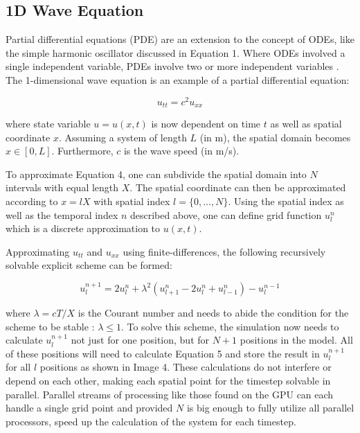 \documentclass[sigconf]{nimeart}
\begin{document}
\subsection{1D Wave Equation}\label{d-wave-equation}

Partial differential equations (PDE) are an extension to the concept of ODEs, like the simple harmonic oscillator discussed in Equation 1. Where ODEs involved a single independent variable, PDEs involve two or more independent variables \cite{Evans2012Numerical}. The 1-dimensional wave equation is an example of a partial differential equation:


\begin{equation}u_{tt} = c^2 u_{xx}\end{equation}


where state variable $u = u(x,t)$ is now dependent on time $t$ as well as spatial coordinate $x$. Assuming a system of length $L$ (in m), the spatial domain becomes $x\in [0, L]$. Furthermore, $c$ is the wave speed (in m/s).

To approximate Equation 4, one can subdivide the spatial domain into $N$ intervals with equal length $X$. The spatial coordinate can then be approximated according to $x=lX$ with spatial index $l = \{0, ..., N\}$. Using the spatial index as well as the temporal index $n$ described above, one can define grid function $u_l^n$ which is a discrete approximation to $u(x,t)$.

Approximating $u_{tt}$ and $u_{xx}$ using finite-differences, the following recursively solvable explicit scheme can be formed:


\begin{equation}u_{l}^{n+1} = 2 u_{l}^{n} + \lambda^2 (u_{l+1}^{n} - 2 u_{l}^{n} + u_{l-1}^{n}) - u_{l}^{n-1}\end{equation}


where $\lambda = c T/X$ is the Courant number and needs to abide the condition for the scheme to be stable \cite{Courant1928Über}: $\lambda \leq 1$. To solve this scheme, the simulation now needs to calculate $u_l^{n+1}$ not just for one position, but for $N+1$ positions in the model. All of these positions will need to calculate Equation 5 and store the result in $u^{n+1}_{l}$ for all $l$ positions as shown in Image 4. These calculations do not interfere or depend on each other, making each spatial point for the timestep solvable in parallel. Parallel streams of processing like those found on the GPU can each handle a single grid point and provided $N$ is big enough to fully utilize all parallel processors, speed up the calculation of the system for each timestep.
\end{document}
